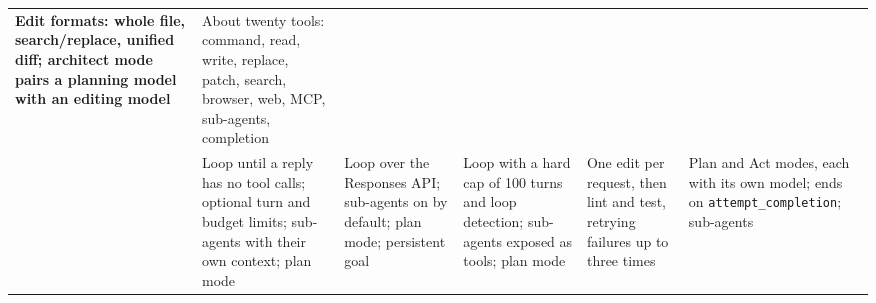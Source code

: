 \begin{table}[p]
\begin{tabularx}{\linewidth}{@{}>{\bfseries}p{1.95cm}YYYYY@{}}
Edit formats: whole file, search/replace, unified diff; architect mode pairs a planning model with an editing model &
About twenty tools: command, read, write, replace, patch, search, browser, web, MCP, sub-agents, completion \\
\addlinespace
{} &
Loop until a reply has no tool calls; optional turn and budget limits; sub-agents with their own context; plan mode &
Loop over the Responses API; sub-agents on by default; plan mode; persistent goal &
Loop with a hard cap of 100 turns and loop detection; sub-agents exposed as tools; plan mode &
One edit per request, then lint and test, retrying failures up to three times &
Plan and Act modes, each with its own model; ends on \texttt{attempt\_completion}; sub-agents \\
\bottomrule
\end{tabularx}
\end{table}

